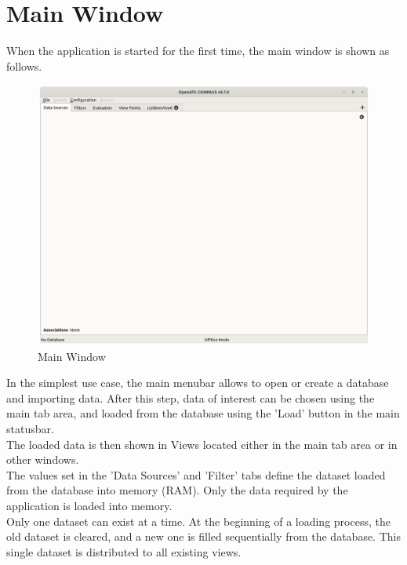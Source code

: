 \section{Main Window}
\label{sec:ui_main_window} 

When the application is started for the first time, the main window is shown as follows. 

\begin{figure}[H]
  \hspace*{-2.5cm}
    \includegraphics[width=19cm]{figures/main_window.png}
  \caption{Main Window}
\end{figure}

In the simplest use case, the main menubar allows to open or create a database and importing data. After this step, data of interest can be chosen using the main tab area, and loaded from the database using the 'Load' button in the main statusbar. \\

The loaded data is then shown in Views located either in the main tab area or in other windows. \\

The values set in the 'Data Sources' and 'Filter' tabs define the dataset loaded from the database into memory (RAM). Only the data required by the application is loaded into memory.\\

Only one dataset can exist at a time. At the beginning of a loading process, the old dataset is cleared, and a new one is filled sequentially from the database. This single dataset is distributed to all existing views. \\

